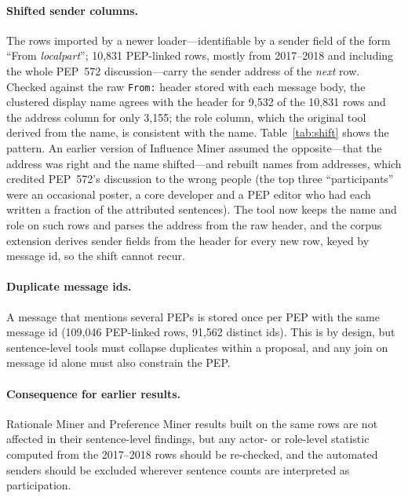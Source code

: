 \paragraph{Shifted sender columns.} The rows imported by a newer loader---identifiable by a sender field of the form ``From \emph{localpart}''; 10,831 PEP-linked rows, mostly from 2017--2018 and including the whole PEP~572 discussion---carry the sender address of the \emph{next} row. Checked against the raw \texttt{From:} header stored with each message body, the clustered display name agrees with the header for 9,532 of the 10,831 rows and the address column for only 3,155; the role column, which the original tool derived from the name, is consistent with the name. Table~\ref{tab:shift} shows the pattern. An earlier version of Influence Miner assumed the opposite---that the address was right and the name shifted---and rebuilt names from addresses, which credited PEP~572's discussion to the wrong people (the top three ``participants'' were an occasional poster, a core developer and a PEP editor who had each written a fraction of the attributed sentences). The tool now keeps the name and role on such rows and parses the address from the raw header, and the corpus extension derives sender fields from the header for every new row, keyed by message id, so the shift cannot recur.


\paragraph{Duplicate message ids.} A message that mentions several PEPs is stored once per PEP with the same message id (109,046 PEP-linked rows, 91,562 distinct ids). This is by design, but sentence-level tools must collapse duplicates within a proposal, and any join on message id alone must also constrain the PEP.

\paragraph{Consequence for earlier results.} Rationale Miner and Preference Miner results built on the same rows are not affected in their sentence-level findings, but any actor- or role-level statistic computed from the 2017--2018 rows should be re-checked, and the automated senders should be excluded wherever sentence counts are interpreted as participation.
